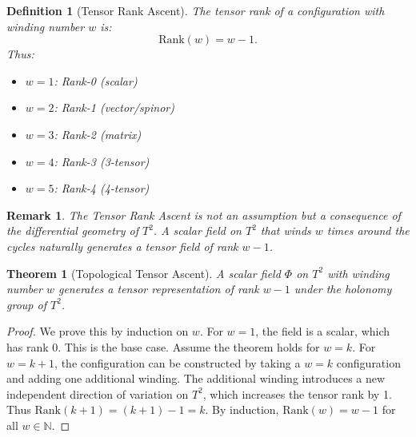 \documentclass[12pt,oneside]{book}
\newtheorem{definition}{Definition}[chapter]
\newtheorem{theorem}{Theorem}[chapter]
\newtheorem{remark}{Remark}[chapter]
\begin{document}
\begin{definition}[Tensor Rank Ascent]
The tensor rank of a configuration with winding number $w$ is:
\[
\mathrm{Rank}(w) = w - 1.
\]
Thus:
\begin{itemize}
    \item $w = 1$: Rank-0 (scalar)
    \item $w = 2$: Rank-1 (vector/spinor)
    \item $w = 3$: Rank-2 (matrix)
    \item $w = 4$: Rank-3 (3-tensor)
    \item $w = 5$: Rank-4 (4-tensor)
\end{itemize}
\end{definition}

\begin{remark}
The Tensor Rank Ascent is not an assumption but a consequence of the differential geometry of $T^2$. A scalar field on $T^2$ that winds $w$ times around the cycles naturally generates a tensor field of rank $w-1$.
\end{remark}

\begin{theorem}[Topological Tensor Ascent]
A scalar field $\Phi$ on $T^2$ with winding number $w$ generates a tensor representation of rank $w-1$ under the holonomy group of $T^2$.
\end{theorem}

\begin{proof}
We prove this by induction on $w$. For $w = 1$, the field is a scalar, which has rank 0. This is the base case. Assume the theorem holds for $w = k$. For $w = k+1$, the configuration can be constructed by taking a $w = k$ configuration and adding one additional winding. The additional winding introduces a new independent direction of variation on $T^2$, which increases the tensor rank by 1. Thus $\mathrm{Rank}(k+1) = (k+1)-1 = k$. By induction, $\mathrm{Rank}(w) = w-1$ for all $w \in \mathbb{N}$.
\end{proof}
\end{document}
